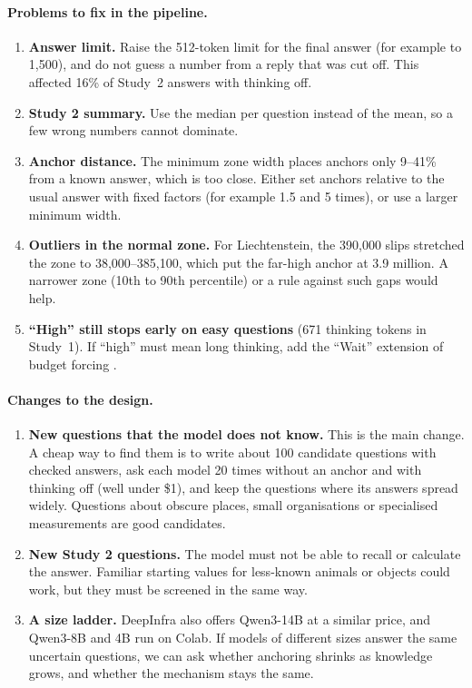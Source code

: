 \documentclass[11pt,a4paper]{article}
\begin{document}
\paragraph{Problems to fix in the pipeline.}
\begin{enumerate}
  \item \textbf{Answer limit.} Raise the 512-token limit for the final answer (for example to 1,500), and do not guess a number from a reply that was cut off. This affected 16\% of Study~2 answers with thinking off.
  \item \textbf{Study 2 summary.} Use the median per question instead of the mean, so a few wrong numbers cannot dominate.
  \item \textbf{Anchor distance.} The minimum zone width places anchors only 9--41\% from a known answer, which is too close. Either set anchors relative to the usual answer with fixed factors (for example 1.5 and 5 times), or use a larger minimum width.
  \item \textbf{Outliers in the normal zone.} For Liechtenstein, the 390,000 slips stretched the zone to 38,000--385,100, which put the far-high anchor at 3.9 million. A narrower zone (10th to 90th percentile) or a rule against such gaps would help.
  \item \textbf{\enquote{High} still stops early on easy questions} (671 thinking tokens in Study~1). If \enquote{high} must mean long thinking, add the \enquote{Wait} extension of budget forcing \citep{muennighoff2025s1}.
\end{enumerate}

\paragraph{Changes to the design.}
\begin{enumerate}
  \item \textbf{New questions that the model does not know.} This is the main change. A cheap way to find them is to write about 100 candidate questions with checked answers, ask each model 20 times without an anchor and with thinking off (well under \$1), and keep the questions where its answers spread widely. Questions about obscure places, small organisations or specialised measurements are good candidates.
  \item \textbf{New Study 2 questions.} The model must not be able to recall or calculate the answer. Familiar starting values for less-known animals or objects could work, but they must be screened in the same way.
  \item \textbf{A size ladder.} DeepInfra also offers Qwen3-14B at a similar price, and Qwen3-8B and 4B run on Colab. If models of different sizes answer the same uncertain questions, we can ask whether anchoring shrinks as knowledge grows, and whether the mechanism stays the same.
\end{enumerate}
\end{document}
